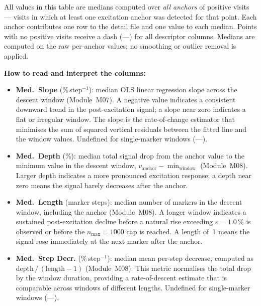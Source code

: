 \documentclass[a4paper,11pt]{article}
\begin{document}
All values in this table are medians computed over \emph{all anchors} of positive visits ---
visits in which at least one excitation anchor was detected for that point. Each anchor
contributes one row to the detail file and one value to each median. Points with no positive
visits receive a dash (---) for all descriptor columns.
Medians are computed on the raw per-anchor values; no smoothing or outlier removal is
applied.

\medskip
\noindent\textbf{How to read and interpret the columns:}

\begin{itemize}

  \item \textbf{Med.\ Slope} (\%\,step$^{-1}$): median OLS linear regression slope across
        the descent window (Module~M07). A negative value indicates a consistent downward
        trend in the post-excitation signal; a slope near zero indicates a flat or irregular
        window. The slope is the rate-of-change estimator that minimises the sum of squared
        vertical residuals between the fitted line and the window values. Undefined for
        single-marker windows (---).

  \item \textbf{Med.\ Depth} (\%): median total signal drop from the anchor value to the
        minimum value in the descent window,
        $v_{\mathrm{anchor}} - \min_{\mathrm{window}}$ (Module~M08). Larger depth indicates
        a more pronounced excitation response; a depth near zero means the signal barely
        decreases after the anchor.

  \item \textbf{Med.\ Length} (marker steps): median number of markers in the descent
        window, including the anchor (Module~M08). A longer window indicates a sustained
        post-excitation decline before a natural rise exceeding
        $\varepsilon = 1.0\,\%$ is observed or before the
        $n_{\max} = 1000$ cap is reached. A length of~1 means the signal rose
        immediately at the next marker after the anchor.

  \item \textbf{Med.\ Step Decr.} (\%\,step$^{-1}$): median mean per-step decrease,
        computed as $\mathrm{depth}\,/\,(\mathrm{length} - 1)$ (Module~M08). This metric
        normalises the total drop by the window duration, providing a rate-of-descent
        estimate that is comparable across windows of different lengths. Undefined for
        single-marker windows (---).

\end{itemize}
\end{document}
